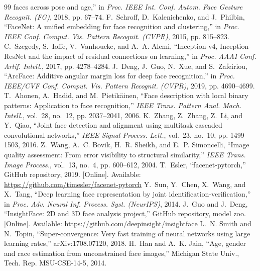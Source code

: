 \documentclass[conference]{IEEEtran}
\begin{document}
\begin{thebibliography}{99}
faces across pose and age,'' in \emph{Proc. IEEE Int. Conf. Autom. Face Gesture Recognit. (FG)}, 2018,
pp. 67--74.
 F.~Schroff, D.~Kalenichenko, and J.~Philbin, ``FaceNet: A unified embedding for face recognition
and clustering,'' in \emph{Proc. IEEE Conf. Comput. Vis. Pattern Recognit. (CVPR)}, 2015, pp. 815--823.
 C.~Szegedy, S.~Ioffe, V.~Vanhoucke, and A.~A. Alemi, ``Inception-v4, Inception-ResNet and the
impact of residual connections on learning,'' in \emph{Proc. AAAI Conf. Artif. Intell.}, 2017, pp. 4278--4284.
 J.~Deng, J.~Guo, N.~Xue, and S.~Zafeiriou, ``ArcFace: Additive angular margin loss for deep face
recognition,'' in \emph{Proc. IEEE/CVF Conf. Comput. Vis. Pattern Recognit. (CVPR)}, 2019, pp. 4690--4699.
 T.~Ahonen, A.~Hadid, and M.~Pietik\"ainen, ``Face description with local binary patterns:
Application to face recognition,'' \emph{IEEE Trans. Pattern Anal. Mach. Intell.}, vol.~28, no.~12,
pp. 2037--2041, 2006.
 K.~Zhang, Z.~Zhang, Z.~Li, and Y.~Qiao, ``Joint face detection and alignment using multitask
cascaded convolutional networks,'' \emph{IEEE Signal Process. Lett.}, vol.~23, no.~10, pp. 1499--1503, 2016.
 Z.~Wang, A.~C. Bovik, H.~R. Sheikh, and E.~P. Simoncelli, ``Image quality assessment: From error
visibility to structural similarity,'' \emph{IEEE Trans. Image Process.}, vol.~13, no.~4, pp. 600--612, 2004.
 T.~Esler, ``facenet-pytorch,'' GitHub repository, 2019. [Online]. Available:
\url{https://github.com/timesler/facenet-pytorch}
 Y.~Sun, Y.~Chen, X.~Wang, and X.~Tang, ``Deep learning face representation by joint
identification-verification,'' in \emph{Proc. Adv. Neural Inf. Process. Syst. (NeurIPS)}, 2014.
 J.~Guo and J.~Deng, ``InsightFace: 2D and 3D face analysis project,'' GitHub repository,
model zoo. [Online]. Available: \url{https://github.com/deepinsight/insightface}
 L.~N. Smith and N.~Topin, ``Super-convergence: Very fast training of neural networks using
large learning rates,'' arXiv:1708.07120, 2018.
 H.~Han and A.~K. Jain, ``Age, gender and race estimation from unconstrained face images,''
Michigan State Univ., Tech. Rep. MSU-CSE-14-5, 2014.
\end{thebibliography}
\end{document}
